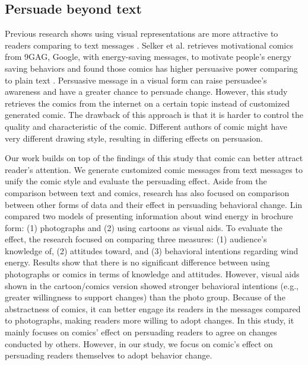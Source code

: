 \subsection{Persuade beyond text}
Previous research shows using visual representations are more attractive to readers comparing to text messages \cite{selker2015sweetbuildinggreeter,lin2013impact,scott1993understanding}. Selker et al. retrieves motivational comics from 9GAG, Google, with energy-saving messages, to motivate people's energy saving behaviors and found those comics has higher persuasive power comparing to plain text \cite{selker2015sweetbuildinggreeter}. Persuasive message in a visual form can raise persuadee's awareness and have a greater chance to persuade change. However, this study retrieves the comics from the internet on a certain topic instead of customized generated comic. The drawback of this approach is that it is harder to control the quality and characteristic of the comic. Different authors of comic might have very different drawing style, resulting in differing effects on persuasion.\par
Our work builds on top of the findings of this study that comic can better attract reader's attention. We generate customized comic messages from text messages to unify the comic style and evaluate the persuading effect. Aside from the comparison between text and comics, research has also focused on comparison between other forms of data and their effect in persuading behavioral change. Lin compared two models of presenting information about wind energy in brochure form: (1) photographs and (2) using cartoons as visual aids. To evaluate the effect, the research focused on comparing three measures: (1) audience's knowledge of, (2) attitudes toward, and (3) behavioral intentions regarding wind energy. Results show that there is no significant difference between using photographs or comics in terms of knowledge and attitudes. However, visual aids shown in the cartoon/comics version showed stronger behavioral intentions (e.g., greater willingness to support changes) than the photo group. Because of the abstractness of comics, it can better engage its readers in the messages compared to photographs, making readers more willing to adopt changes. In this study, it mainly focuses on comics' effect on persuading readers to agree on changes conducted by others. However, in our study, we focus on comic's effect on persuading readers themselves to adopt behavior change.\par



